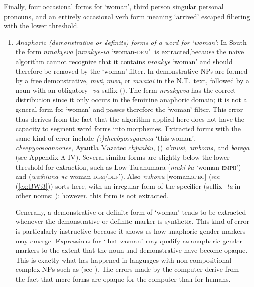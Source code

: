\documentclass[output=collectionpaper]{langsci/langscibook}
\begin{document}
Finally, four occasional forms for ‘woman’, third person singular personal pronouns, and an entirely occasional verb form meaning ‘arrived’ escaped filtering with the lower threshold.

\begin{enumerate}[label=(\alph*)]
\item
\emph{Anaphoric (demonstrative or definite) forms of a word for ‘woman’}: In South  the form \textit{nraakyeva} [\textit{nraakye-va} ‘woman-\textsc{dem}’] is extracted,\linebreak because the naive algorithm cannot recognize that it contains \textit{nraakye} ‘woman’ and should therefore be removed by the ‘woman’ filter. In  demonstrative NPs are formed by a free demonstrative, \textit{mwi}, \textit{mwa}, or \textit{mwatai} in the N.T.\ text, followed by a noun with an obligatory \textit{-va} suffix (\citealt[584]{Vincent2010}). The form \textit{nraakyeva} has the correct distribution since it only occurs in the feminine anaphoric domain; it is not a general form for ‘woman’ and passes therefore the ‘woman’ filter. This error thus derives from the fact that the algorithm applied here does not have the capacity to segment word forms into morphemes. Extracted forms with the same kind of error include  \textit{(:)cheebyoosyaanaa} ‘this woman’,  \textit{cheepyoosoonoonēē}, Ayautla Mazatec \textit{chjunbiu},  () \textit{a'musi},  \textit{ambomo}, and  \textit{barega}
(see Appendix A IV). Several similar forms are slightly below the lower threshold for extraction, such as Low Tarahumara (\textit{muki-ka} ‘woman-\textsc{emph}') and  (\textit{waihiuna-ne} woman-\textsc{dem/def}’). Also  \textit{nukonu} [woman.\textsc{spec}] (see (\ref{ex:BW:3})) sorts here, with an irregular form of the specifier (suffix \textit{-ta} in other nouns; \citealt[92]{Arsjoe1999}); however, this form is not extracted.

Generally, a demonstrative or definite form of ‘woman’ tends to be extracted whenever the demonstrative or definite marker is synthetic. This kind of error is particularly instructive because it shows us how anaphoric gender markers may emerge. Expressions for ‘that woman’ may qualify as anaphoric gender markers to the extent that the noun and demonstrative have become opaque. This is exactly what has happened in languages with non-compositional complex NPs such as  (see  ). The errors made by the computer derive from the fact that more forms are opaque for the computer than for humans.


\end{enumerate}
\end{document}
